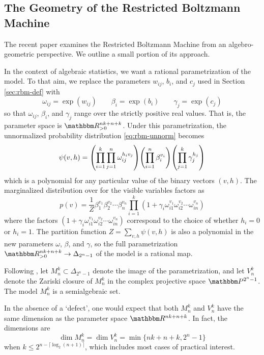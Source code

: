 \documentclass[11pt,titlepage]{article}
\numberwithin{equation}{section}
\begin{document}
    
    
\subsection{The Geometry of the Restricted Boltzmann Machine}
    The recent paper \cite{CMS09} examines the Restricted Boltzmann Machine from
    an algebro-geometric perspective.  We outline a small portion of its
    approach.
    
    In the context of algebraic statistics, we want a rational parametrization
    of the model.  To that aim, we replace the parameters $w_{ij}$, $b_i$, and
    $c_j$ used in Section \ref{sec:rbm-def} with
    \[
        \omega_{ij} = \exp(w_{ij})
        \qquad
        \beta_i = \exp(b_i)
        \qquad
        \gamma_j = \exp(c_j)
    \]
    so that $\omega_{ij}$, $\beta_i$, and $\gamma_j$ range over the strictly
    positive real values.  That is, the parameter space is $\R_{>0}^{nk+n+k}$.
    Under this parametrization, the unnormalized probability distribution
    \eqref{eq:rbm-unnorm} becomes
    \[
        \psi(v, h) = 
            \pdil*{ \prod_{i=1}^k \prod_{j=1}^n \omega_{ij}^{h_i v_j} }
            \pdil*{ \prod_{i=1}^n \beta_i^{v_i} }
            \pdil*{ \prod_{j=1}^k \gamma_j^{h_j} }
    \]
    which is a polynomial for any particular value of the binary vectors
    $(v,h)$.  The marginalized distribution over for the visible variables
    factors as
    \[
        p(v) = \frac 1 Z
        \beta_1^{v_1} \beta_2^{v_2} \cdots \beta_n^{v_n} 
        \prod_{i=1}^k
        (1 + \gamma_i \omega_{i1}^{v_1} \omega_{i2}^{v_2} \cdots \omega_{in}^{v_n})
    \]
    where the factors $(1 + \gamma_i \omega_{i1}^{v_1} \omega_{i2}^{v_2} \cdots
    \omega_{in}^{v_n})$ correspond to the choice of whether $h_i = 0$ or $h_i =
    1$.  The partition function $Z = \sum_{v,h} \psi(v,h)$ is also a polynomial
    in the new parameters $\omega$, $\beta$, and $\gamma$,  so the full
    parametrization $\R_{>0}^{nk+n+k} \to \Delta_{2^n-1}$ of the model is a
    rational map.  

    Following \cite{CMS09}, let $M_n^k \subset \Delta_{2^n-1}$ denote the image
    of the parametrization, and let $V_n^k$ denote the Zariski closure of
    $M_n^k$ in the complex projective space $\Proj^{2^n-1}$.  The model $M_n^k$
    is a semialgebraic set.

    In the absence of a `defect', one would expect that both $M_n^k$ and $V_n^k$
    have the same dimension as the parameter space $\R^{nk + n + k}$.  In fact,
    the dimensions are
    \[
        \dim M_n^k = \dim V_n^k = \min\{nk+n+k, 2^n -1\}
    \]
    when $k \le 2^{n - \lceil \log_2(n+1) \rceil}$, which includes most cases of
    practical interest.
\end{document}

